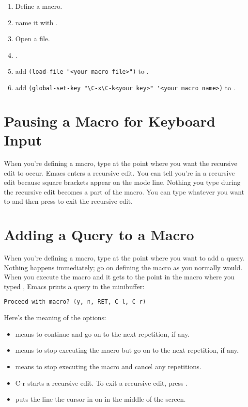 \begin{enumerate}
\item Define a macro.
\item name it with .
\item Open a file.
\item {}.
\item add \lstinline[language=elisp]|(load-file "<your macro file>")| to .
\item add \lstinline[language=elisp]|(global-set-key "\C-x\C-k<your key>" '<your macro name>)| to .
\end{enumerate}




\section[Macro with Input]{Pausing a Macro for Keyboard Input}
\label{sec:paus-macro-keyb}

When you’re defining a macro, type  at the point where you want the recursive edit to occur.
Emacs enters a recursive edit.
You can tell you’re in a recursive edit because square brackets appear on the mode line.
Nothing you type during the recursive edit becomes a part of the macro.
You can type whatever you want to and then press  to exit the recursive edit. 



\section{Adding a Query to a Macro}
\label{sec:adding-query-macro}

When you’re defining a macro, type  at the point where you want to add a query.
Nothing happens immediately; go on defining the macro as you normally would.
When you execute the macro and it gets to the point in the macro where you typed , Emacs prints a query in the minibuffer:
\begin{verbatim}
Proceed with macro? (y, n, RET, C-l, C-r)
\end{verbatim}

Here's the meaning of the options:
\begin{itemize}
\item {} means to continue and go on to the next repetition, if any.
\item {} means to stop executing the macro but go on to the next repetition, if any.
\item {} means to stop executing the macro and cancel any repetitions.
\item {} C-r starts a recursive edit. To exit a recursive edit, press .
\item {} puts the line the cursor in on in the middle of the screen.
\end{itemize}





